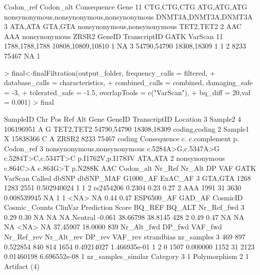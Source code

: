 \documentclass{article}
\begin{document}
\begin{Schunk}
\begin{Soutput}
     Codon_ref   Codon_alt                               Consequence                 Gene
11 CTG,CTG,CTG ATG,ATG,ATG nonsynonymous,nonsynonymous,nonsynonymous DNMT3A,DNMT3A,DNMT3A
3      ATA,ATA     GTA,GTA               nonsynonymous,nonsynonymous            TET2,TET2
2          AAC         AAA                             nonsynonymous                ZRSR2
           GeneID      TranscriptID GATK VarScan
11 1788,1788,1788 10808,10809,10810    1      NA
3     54790,54790       18308,18309    1       1
2            8233             75467   NA       1
\end{Soutput}
\begin{Sinput}
> final<-finalFiltration(output_folder, frequency_calls = filtered,
+                        database_calls = characteristics,
+                        combined_calls = combined, damaging_safe = -3,
+                        tolerated_safe = -1.5, overlapTools = c("VarScan"),
+                        bq_diff = 20,vaf = 0.001)
> final
\end{Sinput}
\begin{Soutput}
  SampleID Chr       Pos Ref Alt      Gene      GeneID TranscriptID      Location
3  Sample2   4 106196951   A   G TET2,TET2 54790,54790  18308,18309 coding,coding
2  Sample1   X  15838366   C   A     ZRSR2        8233        75467        coding
                  Consequence                  c.        c.complement                p. Codon_ref
3 nonsynonymous,nonsynonymous c.5284A>G,c.5347A>G c.5284T>C,c.5347T>C p.I1762V,p.I1783V   ATA,ATA
2               nonsynonymous            c.864C>A            c.864G>T           p.N288K       AAC
  Codon_alt Nr_Ref Nr_Alt   DP         VAF GATK VarScan Called     dbSNP dbSNP_MAF G1000_AF ExAC_AF
3   GTA,GTA   1268   1283 2551 0.502940024    1       1      2 rs2454206    0.2304     0.23    0.27
2       AAA   1991     31 3630 0.008539945   NA       1      1      <NA>        NA     0.44    0.47
  ESP6500_AF GAD_AF CosmicID Cosmic_Counts ClinVar Prediction  Score   BQ_REF  BQ_ALT Nr_Ref_fwd
3       0.29   0.30       NA            NA      NA    Neutral -0.061 38.66798 38.8145        428
2       0.49   0.47       NA            NA      NA       <NA>     NA 37.45907 18.0000        839
  Nr_Alt_fwd DP_fwd  VAF_fwd Nr_Ref_rev Nr_Alt_rev DP_rev    VAF_rev   strandbias nr_samples
3        469    897 0.522854        840        814   1654 0.49214027 1.466935e-01          1
2          0   1507 0.000000       1152         31   2123 0.01460198 6.696552e-08          1
  nr_samples_similar     Category
3                  1 Polymorphism
2                  1 Artifact (4)
\end{Soutput}
\end{Schunk}
\end{document}
